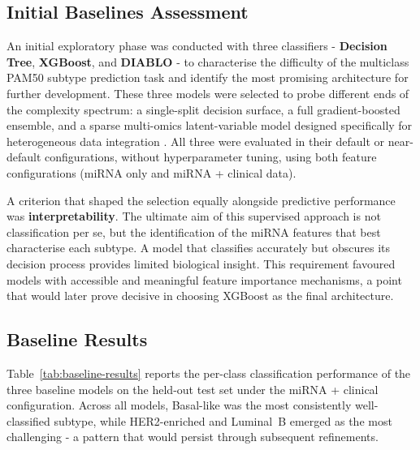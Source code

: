 \subsection{Initial Baselines Assessment}
\label{sec:early-models}
An initial exploratory phase was conducted with three classifiers - 
\textbf{Decision Tree}, \textbf{XGBoost}, and \textbf{DIABLO} - to 
characterise the difficulty of the multiclass PAM50 subtype prediction task 
and identify the most promising architecture for further development. These 
three models were selected to probe different ends of the complexity spectrum: 
a single-split decision surface, a full gradient-boosted ensemble, and a 
sparse multi-omics latent-variable model designed specifically for heterogeneous 
data integration \cite{DIABLO_Singh2019}. All three were evaluated in their 
default or near-default configurations, without hyperparameter tuning, using 
both feature configurations (miRNA only and miRNA + clinical data).

A criterion that shaped the selection equally alongside predictive performance 
was \textbf{interpretability}. The ultimate aim of this supervised approach is 
not classification per se, but the identification of the miRNA features 
that best characterise each subtype. A model that classifies accurately but 
obscures its decision process provides limited biological insight. This 
requirement favoured models with accessible and meaningful feature importance 
mechanisms, a point that would later prove decisive in choosing XGBoost as 
the final architecture.

\subsection{Baseline Results}
Table~\ref{tab:baseline-results} reports the per-class classification 
performance of the three baseline models on the held-out test set under 
the miRNA + clinical configuration. Across all models, Basal-like 
was the most consistently well-classified subtype, while HER2-enriched 
and Luminal~B emerged as the most challenging - a pattern that would 
persist through subsequent refinements.

